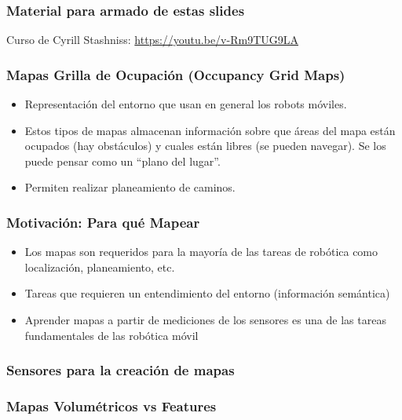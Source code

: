 \begin{frame}
	\frametitle{Material para armado de estas slides}
	Curso de Cyrill Stashniss: \url{https://youtu.be/v-Rm9TUG9LA}

\end{frame}

\begin{frame}
    \frametitle{Mapas Grilla de Ocupación (Occupancy Grid Maps)}
    
    \begin{itemize}
    \item Representación del entorno que usan en general los robots móviles.
    \item Estos tipos de mapas almacenan información sobre que áreas del mapa están ocupados (hay obstáculos) y cuales están libres (se pueden navegar). Se los puede pensar como un ``plano del lugar''.
    \item Permiten realizar planeamiento de caminos.
    \end{itemize}

    
    
\end{frame}

\begin{frame}
    \frametitle{Motivación: Para qué Mapear}
    
    \begin{itemize}
        \item Los mapas son requeridos para la mayoría de las tareas de robótica como localización, planeamiento, etc.
        \item Tareas que requieren un entendimiento del entorno (información semántica)
        \item Aprender mapas a partir de mediciones de los sensores es una de las tareas fundamentales de las robótica móvil
    \end{itemize}
    
\end{frame}

\begin{frame}
    \frametitle{Sensores para la creación de mapas}
    
    
\end{frame}

\begin{frame}
    \frametitle{Mapas Volumétricos vs Features}
    
    
\end{frame}


